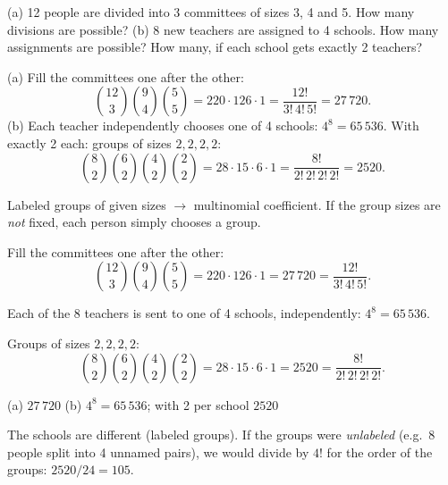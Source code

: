 
\begin{problem}
	(a) 12 people are divided into 3 committees of sizes 3, 4 and 5. How many
	divisions are possible?
	(b) 8 new teachers are assigned to 4 schools. How many assignments are
	possible? How many, if each school gets exactly 2 teachers?
\end{problem}

\begin{slides}
	\small
	\exstatement
	\pause
	\sol
	(a) Fill the committees one after the other:
	\[ \binom{12}{3}\binom{9}{4}\binom55 = 220\cdot126\cdot 1
		= \dfrac{12!}{3!\,4!\,5!} = 27\,720. \]
	(b) Each teacher independently chooses one of 4 schools: $4^8 = 65\,536$.
	With exactly 2 each: groups of sizes $2,2,2,2$:
	\[ \binom82\binom62\binom42\binom22 = 28\cdot15\cdot6\cdot1 =
		\dfrac{8!}{2!\,2!\,2!\,2!} = 2520. \]
\end{slides}

\begin{solution}
	\idea Labeled groups of given sizes $\to$ multinomial coefficient. If the
	group sizes are \emph{not} fixed, each person simply chooses a group.

	 Fill the committees one after the other:
	\[ \binom{12}{3}\binom94\binom55=220\cdot126\cdot1=27\,720
		=\frac{12!}{3!\,4!\,5!}. \]

	 Each of the 8 teachers is sent to one of 4
	schools, independently: $4^8=65\,536$.

	 Groups of sizes $2,2,2,2$:
	\[ \binom82\binom62\binom42\binom22=28\cdot15\cdot6\cdot1=2520
		=\frac{8!}{2!\,2!\,2!\,2!}. \]
	\begin{answer}
		(a) $27\,720$ \qquad (b) $4^8=65\,536$; with 2 per school $2520$
	\end{answer}
	\begin{remark}
		The schools are different (labeled groups). If the groups were
		\emph{unlabeled} (e.g.\ 8 people split into 4 unnamed pairs), we would
		divide by $4!$ for the order of the groups: $2520/24=105$.
	\end{remark}
\end{solution}
